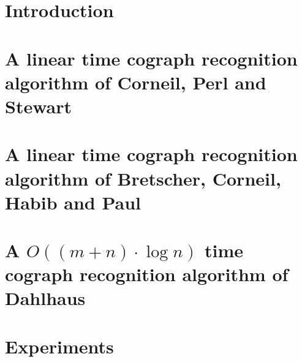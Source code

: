 \documentclass{report}
\begin{document}


\pagebreak
\tableofcontents

\pagebreak
\chapter{Introduction}



\chapter{A linear time cograph recognition algorithm of Corneil, Perl and Stewart}

\chapter{A linear time cograph recognition algorithm of Bretscher, Corneil, Habib and Paul}

\chapter{A $O((m + n) \cdot \log{n})$ time cograph recognition algorithm of Dahlhaus}

\chapter{Experiments}

\printbibliography
\end{document}
